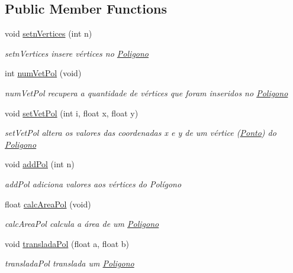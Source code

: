 \subsection*{Public Member Functions}
\begin{DoxyCompactItemize}
\item 
void \hyperlink{class_poligono_aa16b7ba7aaed5bdbef77862a69901823}{setn\+Vertices} (int n)
\begin{DoxyCompactList}\small\item\em setn\+Vertices insere vértices no \hyperlink{class_poligono}{Poligono} \end{DoxyCompactList}\item 
int \hyperlink{class_poligono_a0f63ca667ce8c15230353a5130baf3dd}{num\+Vet\+Pol} (void)
\begin{DoxyCompactList}\small\item\em num\+Vet\+Pol recupera a quantidade de vértices que foram inseridos no \hyperlink{class_poligono}{Poligono} \end{DoxyCompactList}\item 
void \hyperlink{class_poligono_a07656338edbd5bbd0b9bb7f4272717c1}{set\+Vet\+Pol} (int i, float x, float y)
\begin{DoxyCompactList}\small\item\em set\+Vet\+Pol altera os valores das coordenadas x e y de um vértice (\hyperlink{class_ponto}{Ponto}) do \hyperlink{class_poligono}{Poligono} \end{DoxyCompactList}\item 
void \hyperlink{class_poligono_a22bdea51dc2a5907b6f2f2dcf034c155}{add\+Pol} (int n)
\begin{DoxyCompactList}\small\item\em add\+Pol adiciona valores aos vértices do Polígono \end{DoxyCompactList}\item 
float \hyperlink{class_poligono_a5cc5994a3ec316c29b32c0f514167e88}{calc\+Area\+Pol} (void)
\begin{DoxyCompactList}\small\item\em calc\+Area\+Pol calcula a área de um \hyperlink{class_poligono}{Poligono} \end{DoxyCompactList}\item 
void \hyperlink{class_poligono_aa4948d6082b1cde7f7b683dacb88fde7}{translada\+Pol} (float a, float b)
\begin{DoxyCompactList}\small\item\em translada\+Pol translada um \hyperlink{class_poligono}{Poligono} \end{DoxyCompactList}\item 

\end{DoxyCompactItemize}
